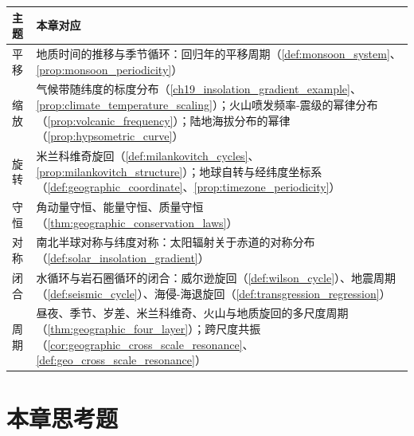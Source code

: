 \begin{center}
\renewcommand{\arraystretch}{1.3}
\begin{tabular}{>{\centering\arraybackslash}p{2.2cm}>{\centering\arraybackslash}p{10.5cm}}
\toprule
主题 & 本章对应 \\
\midrule
平移 & 地质时间的推移与季节循环：回归年的平移周期（\cref{def:monsoon_system}、\cref{prop:monsoon_periodicity}） \\
缩放 & 气候带随纬度的标度分布（\cref{ch19_insolation_gradient_example}、\cref{prop:climate_temperature_scaling}）；火山喷发频率-震级的幂律分布（\cref{prop:volcanic_frequency}）；陆地海拔分布的幂律（\cref{prop:hypsometric_curve}） \\
旋转 & 米兰科维奇旋回（\cref{def:milankovitch_cycles}、\cref{prop:milankovitch_structure}）；地球自转与经纬度坐标系（\cref{def:geographic_coordinate}、\cref{prop:timezone_periodicity}） \\
守恒 & 角动量守恒、能量守恒、质量守恒（\cref{thm:geographic_conservation_laws}） \\
对称 & 南北半球对称与纬度对称：太阳辐射关于赤道的对称分布（\cref{def:solar_insolation_gradient}） \\
闭合 & 水循环与岩石圈循环的闭合：威尔逊旋回（\cref{def:wilson_cycle}）、地震周期（\cref{def:seismic_cycle}）、海侵-海退旋回（\cref{def:transgression_regression}） \\
周期 & 昼夜、季节、岁差、米兰科维奇、火山与地质旋回的多尺度周期（\cref{thm:geographic_four_layer}）；跨尺度共振（\cref{cor:geographic_cross_scale_resonance}、\cref{def:geo_cross_scale_resonance}） \\
\bottomrule
\end{tabular}
\end{center}

\section*{本章思考题}

